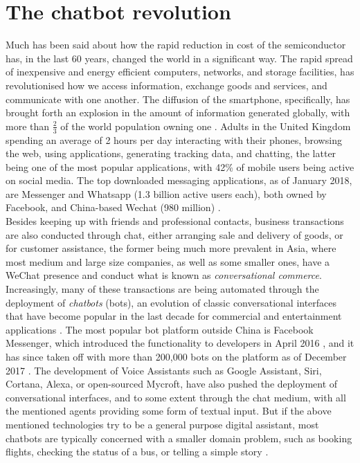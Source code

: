 \section{The chatbot revolution}
Much has been said about how the rapid reduction in cost of the semiconductor has, in the last 60 years, changed the world in a significant way. The rapid spread of inexpensive and energy efficient computers, networks, and storage facilities, has revolutionised how we access information, exchange goods and services, and communicate with one another. The diffusion of the smartphone, specifically, has brought forth an explosion in the amount of information generated globally, with more than $\frac{2}{3}$ of the world population owning one \cite{wearesocial}. Adults in the United Kingdom spending an average of 2 hours per day interacting with their phones, browsing the web, using applications, generating tracking data, and chatting, the latter being one of the most popular applications, with 42\% of mobile users \cite{mobilesocial} being active on social media. The top downloaded messaging applications, as of January 2018, are Messenger and Whatsapp (1.3 billion active users each), both owned by Facebook, and China-based Wechat (980 million) \cite{mobilestatista}. \\
Besides keeping up with friends and professional contacts, business transactions are also conducted through chat, either arranging sale and delivery of goods, or for customer assistance, the former being much more prevalent in Asia, where most medium and large size companies, as well as some smaller ones, have a WeChat presence and conduct what is known as \textit{conversational commerce}. Increasingly, many of these transactions are being automated through the deployment of \textit{chatbots} (bots), an evolution of classic conversational interfaces that have become popular in the last decade for commercial and entertainment applications \cite{Dale2016}. The most popular bot platform outside China is Facebook Messenger, which introduced the functionality to developers in April 2016 \cite{Messenger2016}, and it has since taken off with more than 200,000 bots on the platform as of December 2017 \cite{Messenger2017}. The development of Voice Assistants such as Google Assistant, Siri, Cortana, Alexa, or open-sourced Mycroft, have also pushed the deployment of conversational interfaces, and to some extent through the chat medium, with all the mentioned agents providing some form of textual input. But if the above mentioned technologies try to be a general purpose digital assistant, most chatbots are typically concerned with a smaller domain problem, such as booking flights, checking the status of a bus, or telling a simple story \cite{meisel}. \\
